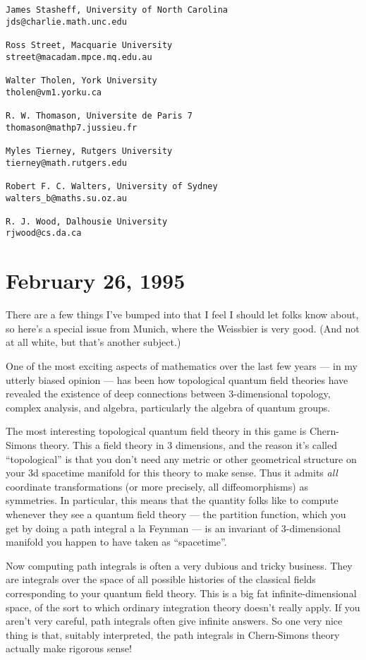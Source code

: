 \documentclass{article}
\begin{document}
\begin{verbatim}
James Stasheff, University of North Carolina
jds@charlie.math.unc.edu
 
Ross Street, Macquarie University 
street@macadam.mpce.mq.edu.au
 
Walter Tholen, York University
tholen@vm1.yorku.ca
 
R. W. Thomason, Universite de Paris 7
thomason@mathp7.jussieu.fr
 
Myles Tierney, Rutgers University
tierney@math.rutgers.edu
 
Robert F. C. Walters, University of Sydney
walters_b@maths.su.oz.au
 
R. J. Wood, Dalhousie University
rjwood@cs.da.ca
\end{verbatim}
\hypertarget{week48}{%
\section{February 26, 1995}\label{week48}}

There are a few things I've bumped into that I feel I should let folks
know about, so here's a special issue from Munich, where the Weissbier
is very good. (And not at all white, but that's another subject.)

One of the most exciting aspects of mathematics over the last few years
--- in my utterly biased opinion --- has been how topological quantum
field theories have revealed the existence of deep connections between
3-dimensional topology, complex analysis, and algebra, particularly the
algebra of quantum groups.

The most interesting topological quantum field theory in this game is
Chern-Simons theory. This a field theory in 3 dimensions, and the reason
it's called ``topological'' is that you don't need any metric or other
geometrical structure on your 3d spacetime manifold for this theory to
make sense. Thus it admits \emph{all} coordinate transformations (or
more precisely, all diffeomorphisms) as symmetries. In particular, this
means that the quantity folks like to compute whenever they see a
quantum field theory --- the partition function, which you get by doing
a path integral a la Feynman --- is an invariant of 3-dimensional
manifold you happen to have taken as ``spacetime''.

Now computing path integrals is often a very dubious and tricky
business. They are integrals over the space of all possible histories of
the classical fields corresponding to your quantum field theory. This is
a big fat infinite-dimensional space, of the sort to which ordinary
integration theory doesn't really apply. If you aren't very careful,
path integrals often give infinite answers. So one very nice thing is
that, suitably interpreted, the path integrals in Chern-Simons theory
actually make rigorous sense!
\end{document}
